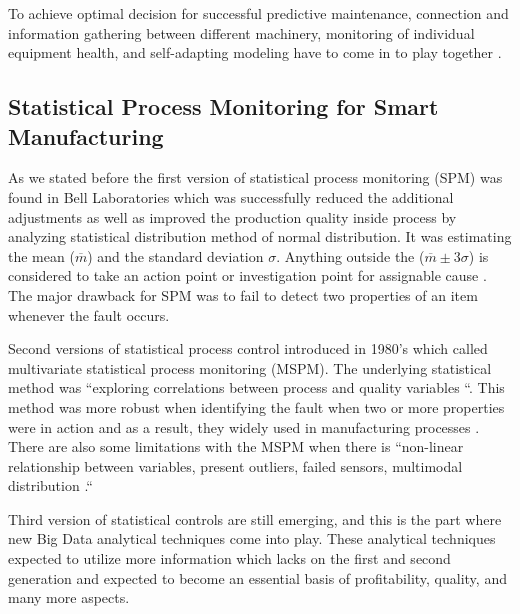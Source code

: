 \documentclass[sigconf]{acmart}
\begin{document}
\par To achieve optimal decision for successful predictive maintenance, connection and information gathering between different machinery, monitoring of individual equipment health, and self-adapting modeling have to come in to play together \cite{HE2017}. 

\subsection{Statistical Process Monitoring for Smart Manufacturing}

As we stated before the first version of statistical process monitoring (SPM) was found in Bell Laboratories which was successfully reduced the additional adjustments as well as improved the production quality inside process by analyzing statistical distribution method of normal distribution. It was estimating the mean ($\overline{m}$) and the standard deviation $\sigma $. Anything outside the ($\overline{m}\pm 3\sigma$) is considered to take an action point or investigation point for assignable cause \cite{HE2017}. The major drawback for SPM was to fail to detect two properties of an item whenever the fault occurs.


\par Second versions of statistical process control introduced in 1980's which called multivariate statistical process monitoring (MSPM). The underlying statistical method was ``exploring correlations between process and quality variables \cite{HE2017}``. This method was more robust when identifying the fault when two or more properties were in action and as a result, they widely used in manufacturing processes \cite{HE2017}. There are also some limitations with the MSPM when there is ``non-linear relationship between variables, present outliers, failed sensors, multimodal distribution \cite{HE2017}.``



\par Third version of statistical controls are still emerging, and this is the part where new Big Data analytical techniques come into play. These analytical techniques expected to utilize more information which lacks on the first and second generation and expected to become an essential basis of profitability, quality, and many more aspects.

\end{document}
